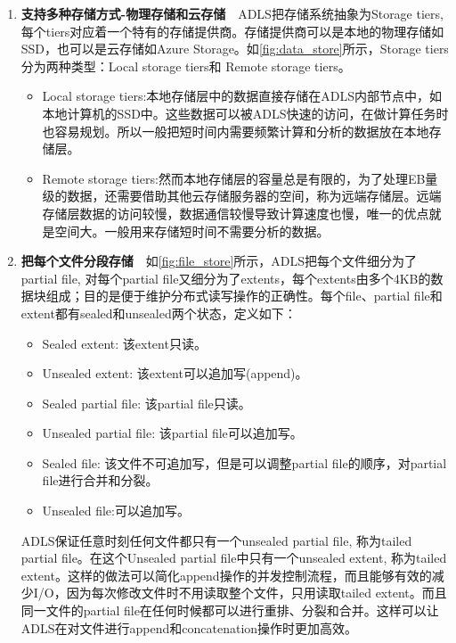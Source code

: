 \documentclass[11pt]{article}
\begin{document}
\begin{enumerate}
	\item \textbf{支持多种存储方式-物理存储和云存储}\ \ ADLS把存储系统抽象为Storage tiers, 每个tiers对应着一个特有的存储提供商。存储提供商可以是本地的物理存储如SSD，也可以是云存储如Azure Storage。如\ref{fig:data_store}所示，Storage tiers分为两种类型：Local storage tiers和 Remote storage tiers。
	\begin{itemize}
		\item Local storage tiers:本地存储层中的数据直接存储在ADLS内部节点中，如本地计算机的SSD中。这些数据可以被ADLS快速的访问，在做计算任务时也容易规划。所以一般把短时间内需要频繁计算和分析的数据放在本地存储层。
		\item Remote storage tiers:然而本地存储层的容量总是有限的，为了处理EB量级的数据，还需要借助其他云存储服务器的空间，称为远端存储层。远端存储层数据的访问较慢，数据通信较慢导致计算速度也慢，唯一的优点就是空间大。一般用来存储短时间不需要分析的数据。
	\end{itemize}
	\item \textbf{把每个文件分段存储}\ \ 如\ref{fig:file_store}所示，ADLS把每个文件细分为了partial file, 对每个partial file又细分为了extents，每个extents由多个4KB的数据块组成；目的是便于维护分布式读写操作的正确性。每个file、partial file和extent都有sealed和unsealed两个状态，定义如下：
	\begin{itemize}
		\item Sealed extent: 该extent只读。
		\item Unsealed extent: 该extent可以追加写(append)。
		\item Sealed partial file: 该partial file只读。
		\item Unsealed partial file: 该partial file可以追加写。
		\item Sealed file: 该文件不可追加写，但是可以调整partial file的顺序，对partial file进行合并和分裂。
		\item Unsealed file:可以追加写。
	\end{itemize}
	ADLS保证任意时刻任何文件都只有一个unsealed partial file, 称为tailed partial file。在这个Unsealed partial file中只有一个unsealed extent, 称为tailed extent。这样的做法可以简化append操作的并发控制流程，而且能够有效的减少I/O，因为每次修改文件时不用读取整个文件，只用读取tailed extent。而且同一文件的partial file在任何时候都可以进行重排、分裂和合并。这样可以让ADLS在对文件进行append和concatenation操作时更加高效。
\end{enumerate}
\end{document}
